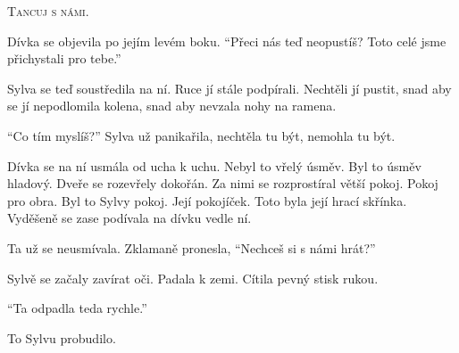 \documentclass[10pt]{article}
\begin{document}
\begin{spacing}{1}
	\textsc{Tancuj s námi.}\par
	Dívka se objevila po jejím levém boku.
	\enquote{Přeci nás teď neopustíš?
	Toto celé jsme přichystali pro tebe.}\par
	Sylva se teď soustředila na ní.
	Ruce jí stále podpírali.
	Nechtěli jí pustit, snad aby se jí nepodlomila kolena,
	snad aby nevzala nohy na ramena.\par
	\enquote{Co tím myslíš?} Sylva už panikařila,
	nechtěla tu být, nemohla tu být.\par
	Dívka se na ní usmála od ucha k uchu.
	Nebyl to vřelý úsměv.
	Byl to úsměv hladový.
	Dveře se rozevřely dokořán.
	Za nimi se rozprostíral větší pokoj.
	Pokoj pro obra.
	Byl to Sylvy pokoj.
	Její pokojíček.
	Toto byla její hrací skřínka.
	Vyděšeně se zase podívala na dívku vedle ní.\par
	Ta už se neusmívala. Zklamaně pronesla, \enquote{Nechceš si s námi hrát?}\par
	Sylvě se začaly zavírat oči.
	Padala k zemi.
	Cítila pevný stisk rukou.\par
	\vfill
	\enquote{Ta odpadla teda rychle.}\par
	To Sylvu probudilo.
\end{spacing}
\end{document}
